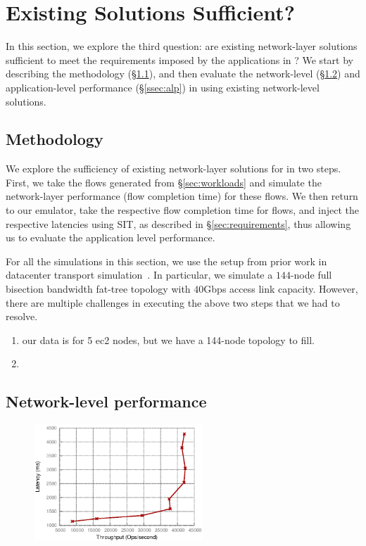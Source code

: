 \section{Existing Solutions Sufficient?}
\label{sec:existing}
In this section, we explore the third question: are existing network-layer solutions sufficient to meet the requirements imposed by the applications in \dis? We start by describing the methodology (\S\ref{ssec:ssmethod}), and then evaluate the network-level (\S\ref{ssec:nlp}) and application-level performance (\S\ref{ssec:alp}) in \dis using existing network-level solutions.

\subsection{Methodology}
\label{ssec:ssmethod}
We explore the sufficiency of existing network-layer solutions for \dis in two steps. First, we take the flows generated from \S\ref{sec:workloads} and simulate the network-layer performance (flow completion time) for these flows. We then return to our emulator, take the respective flow completion time for flows, and inject the respective latencies using SIT, as described in \S\ref{sec:requirements}, thus allowing us to evaluate the application level performance. 

For all the simulations in this section, we use the setup from prior work in datacenter transport simulation~\cite{pfabric, phost}. In particular, we simulate a $144$-node full bisection bandwidth fat-tree topology with $40$Gbps access link capacity.  However, there are multiple challenges in executing the above two steps that we had to resolve.

\begin{enumerate}
\item our data is for 5 ec2 nodes, but we have a 144-node topology to fill.
\item 
\end{enumerate}



\subsection{Network-level performance}
\label{ssec:nlp}

%
\begin{figure}
  \centering
    \includegraphics[width = 2.5in]{img/thvsla_get} 
  \caption{\small{}}
  \label{fig:phostp}
\end{figure}
%

